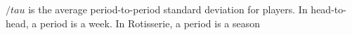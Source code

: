 \documentclass[preview]{standalone}
\begin{document}
\begin{center}
$/tau$ is the average period-to-period 
standard deviation for players. 
In head-to-head, a period is a week. 
In Rotisserie, a period is a season
\end{center}
\end{document}
